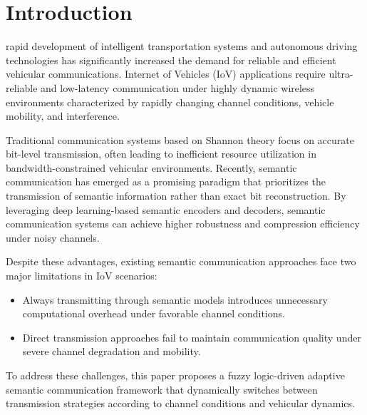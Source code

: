 \documentclass[lettersize,journal]{IEEEtran}
\begin{document}
\section{Introduction}

 rapid development of intelligent transportation systems and autonomous driving technologies has significantly increased the demand for reliable and efficient vehicular communications. Internet of Vehicles (IoV) applications require ultra-reliable and low-latency communication under highly dynamic wireless environments characterized by rapidly changing channel conditions, vehicle mobility, and interference.

Traditional communication systems based on Shannon theory focus on accurate bit-level transmission, often leading to inefficient resource utilization in bandwidth-constrained vehicular environments. Recently, semantic communication has emerged as a promising paradigm that prioritizes the transmission of semantic information rather than exact bit reconstruction. By leveraging deep learning-based semantic encoders and decoders, semantic communication systems can achieve higher robustness and compression efficiency under noisy channels.

Despite these advantages, existing semantic communication approaches face two major limitations in IoV scenarios:
\begin{itemize}
    \item Always transmitting through semantic models introduces unnecessary computational overhead under favorable channel conditions.
    \item Direct transmission approaches fail to maintain communication quality under severe channel degradation and mobility.
\end{itemize}

To address these challenges, this paper proposes a fuzzy logic-driven adaptive semantic communication framework that dynamically switches between transmission strategies according to channel conditions and vehicular dynamics.
\end{document}
